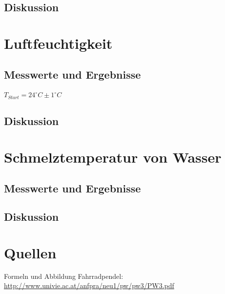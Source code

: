\documentclass[12pt,a4paper]{article}
\begin{document}
\begin{multicols}{2}
\subsection{Diskussion}


\section{Luftfeuchtigkeit}
\subsection{Messwerte und Ergebnisse}
$T_{Start} = 24^{\circ}C \pm 1^{\circ}C$\\

\subsection{Diskussion}

\section{Schmelztemperatur von Wasser}

\subsection{Messwerte und Ergebnisse}

\subsection{Diskussion}

\section{Quellen}
Formeln und Abbildung Fahrradpendel:\\
\url{http://www.univie.ac.at/anfpra/neu1/pw/pw3/PW3.pdf}\\


\end{multicols}
\end{document}
